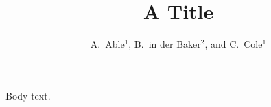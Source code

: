 \documentclass{amsart}
\begin{document}
\title{A Title}
\author{A.~Able$^{1}$, B.~in der Baker$^{2}$, and C.~Cole$^{1}$}
\address{$^{1}$ Institute of One; $^{2}$ University of Two}
\maketitle
Body text.
\end{document}
